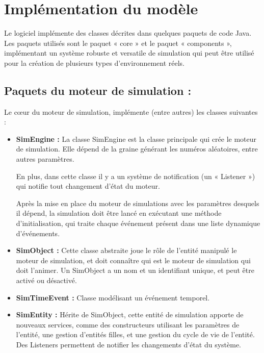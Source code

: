 \documentclass[12pt]{article} %
\begin{document}
\newpage
\section{Implémentation du modèle}\label{implementation}
Le logiciel implémente des classes décrites dans quelques paquets de code Java. Les paquets utilisés sont le paquet « core » et le paquet « components », implémentant un système robuste et versatile de simulation qui peut être utilisé pour la création de plusieurs types d’environnement réels.

\subsection{Paquets du moteur de simulation :}
Le cœur du moteur de simulation, implémente (entre autres) les classes suivantes :

\begin{itemize}
\item \textbf{SimEngine :}
La classe SimEngine est la classe principale qui crée le moteur de simulation. Elle dépend de la graine générant les numéros aléatoires, entre autres paramètres.

En plus, dans cette classe il y a un système de notification (un « Listener ») qui notifie tout changement d'état du moteur. 

Après la mise en place du moteur de simulations avec les paramètres desquels il dépend, la simulation doit être lancé en exécutant une méthode d'initialisation, qui traite chaque événement présent dans une liste dynamique d'événements. 

\item \textbf{SimObject :} Cette classe abstraite joue le rôle de l’entité manipulé le moteur de simulation, et doit connaître qui est le moteur de simulation qui doit l'animer.
Un SimObject a un nom et un identifiant unique, et peut être activé ou désactivé.

\item \textbf{SimTimeEvent :} Classe modélisant un événement temporel.

\item \textbf{SimEntity :} Hérite de SimObject, cette entité de simulation apporte de nouveaux services, comme des constructeurs utilisant les paramètres de l’entité, une gestion d’entités filles, et une gestion du cycle de vie de l’entité. Des Listeners permettent de notifier les changements d’état du système.

\end{itemize}
\end{document}
